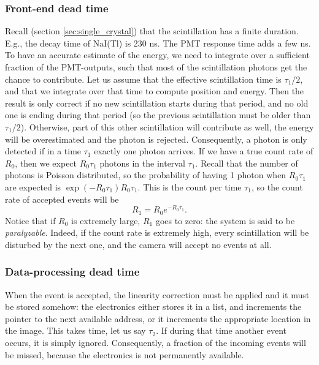 \documentclass[11pt,oneside]{book}
\begin{document}
\subsubsection{Front-end dead time}
Recall (section \ref{sec:single_crystal}) that the scintillation has
a finite duration. E.g., the decay time of NaI(Tl) is 230 ns. The PMT
response time adds a few ns. To have an accurate estimate of the
energy, we need to integrate over a sufficient fraction of the
PMT-outputs, such that most of the scintillation photons get the
chance to contribute. Let us assume that the effective scintillation
time is $\tau_1 / 2$, and that we integrate over that time to compute
position and energy. Then the result is only correct if no new
scintillation starts during that period, and no old one is ending
during that period (so the previous scintillation must be older than
$\tau_1/2$).  Otherwise, part of this other scintillation will
contribute as well, the energy will be overestimated and the photon is
rejected. Consequently, a photon is only detected if in a time
$\tau_1$ exactly one photon arrives.  If we have a true count rate of
$R_0$, then we expect $R_0 \tau_1$ photons in the interval
$\tau_1$. Recall that the number of photons is Poisson distributed, so
the probability of having 1 photon when $R_0 \tau_1$ are expected is
$\exp(- R_0 \tau_1) R_0 \tau_1$. This is the count per time $\tau_1$,
so the count rate of accepted events will be
\begin{equation}
  R_1 = R_0 e^{-R_0 \tau_1}. \label{eq:deadtime_front}
\end{equation}
Notice that if $R_0$ is extremely large, $R_1$ goes to zero: the system is
said to be {\em paralyzable}. Indeed, if the count rate is extremely high,
every scintillation will be disturbed by the next one, and the camera will
accept no events at all.

\subsubsection{Data-processing dead time}
When the event is accepted, the linearity correction must be applied and it
must be stored somehow: the electronics either stores it in a list, and
increments the pointer to the next available address, or it increments the
appropriate location in the image. This takes time, let us say $\tau_2$. If
during that time another event occurs, it is simply ignored. Consequently, a
fraction of the incoming events will be missed, because the electronics is not
permanently available.
\end{document}
